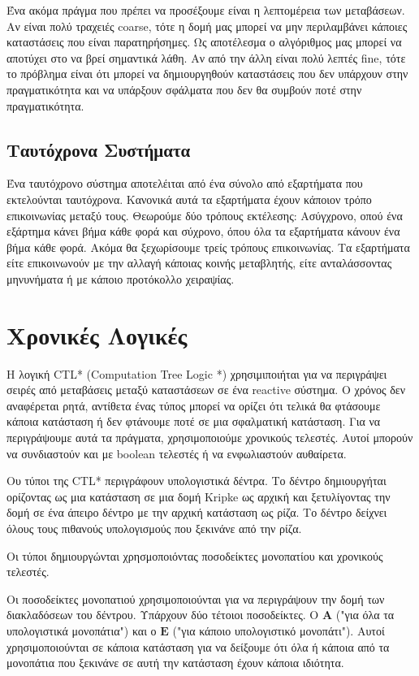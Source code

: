 \documentclass{article}
\newcommand{\english}[1]{\foreignlanguage{english}{{#1}}}
\begin{document}
 Ένα ακόμα πράγμα που πρέπει να προσέξουμε είναι η λεπτομέρεια των μεταβάσεων. Αν είναι πολύ τραχειές \english{coarse}, τότε η δομή μας μπορεί να μην περιλαμβάνει κάποιες καταστάσεις που είναι παρατηρήσημες. Ως αποτέλεσμα ο αλγόριθμος μας μπορεί να αποτύχει στο να βρεί σημαντικά λάθη. Αν από την άλλη είναι πολύ λεπτές \english{fine}, τότε το πρόβλημα είναι ότι μπορεί να δημιουργηθούν καταστάσεις που δεν υπάρχουν στην πραγματικότητα και να υπάρξουν σφάλματα που δεν θα συμβούν ποτέ στην πραγματικότητα.

 \subsection*{Ταυτόχρονα Συστήματα}

 Ένα ταυτόχρονο σύστημα αποτελέιται από ένα σύνολο από εξαρτήματα που εκτελούνται ταυτόχρονα. Κανονικά αυτά τα εξαρτήματα έχουν κάποιον τρόπο επικοινωνίας μεταξύ τους. Θεωρούμε δύο τρόπους εκτέλεσης: Ασύγχρονο, οπού ένα εξάρτημα κάνει βήμα κάθε φορά και σύχρονο, όπου όλα τα εξαρτήματα κάνουν ένα βήμα κάθε φορά. Ακόμα θα ξεχωρίσουμε τρείς τρόπους επικοινωνίας. Τα εξαρτήματα είτε επικοινωνούν με την αλλαγή κάποιας κοινής μεταβλητής, είτε ανταλάσσοντας μηνυνήματα ή με κάποιο προτόκολλο χειραψίας. 

 \section*{Χρονικές Λογικές}
 Η λογική \english{CTL* (Computation Tree Logic *)} χρησιμιποιήται για να περιγράψει σειρές από μεταβάσεις μεταξύ καταστάσεων σε ένα \english{reactive} σύστημα. Ο χρόνος δεν αναφέρεται ρητά, αντίθετα ένας τύπος μπορεί να ορίζει ότι τελικά θα φτάσουμε κάποια κατάσταση ή δεν φτάνουμε ποτέ σε μια σφαλματική κατάσταση. Για να περιγράψουμε αυτά τα πράγματα, χρησιμοποιούμε χρονικούς τελεστές. Αυτοί μπορούν να συνδιαστούν και με \english{boolean} τελεστές ή να ενφωλιαστούν αυθαίρετα.

 Ου τύποι της \english{CTL*} περιγράφουν υπολογιστικά δέντρα. Το δέντρο δημιουργήται ορίζοντας ως μια κατάσταση σε μια δομή \english{Kripke} ως αρχική και ξετυλίγοντας την δομή σε ένα άπειρο δέντρο με την αρχική κατάσταση ως ρίζα. Το δέντρο δείχνει όλους τους πιθανούς υπολογισμούς που ξεκινάνε από την ρίζα. 

 Οι τύποι δημιουργώνται χρησμοποιόντας ποσοδείκτες μονοπατίου και χρονικούς τελεστές.

 Οι ποσοδείκτες μονοπατιού χρησιμοποιούνται για να περιγράψουν την δομή των διακλαδόσεων του δέντρου. Υπάρχουν δύο τέτοιοι ποσοδείκτες. Ο $\mathbf{A}$ ("για όλα τα υπολογιστικά μονοπάτια") και ο $\mathbf{E}$ ("για κάποιο υπολογιστικό μονοπάτι"). Αυτοί χρησιμοποιούνται σε κάποια κατάσταση για να δείξουμε ότι όλα ή κάποια από τα μονοπάτια που ξεκινάνε σε αυτή την κατάσταση έχουν κάποια ιδιότητα.
\end{document}
